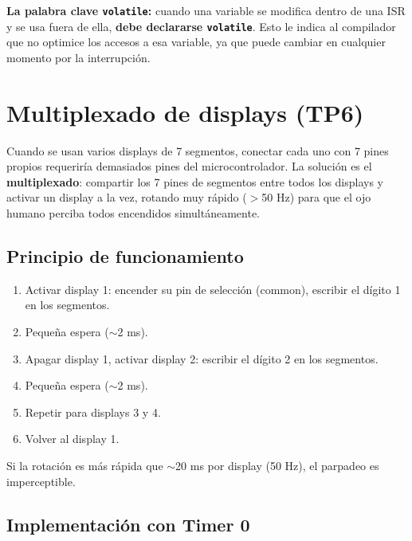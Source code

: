 \begin{notabox}
\textbf{La palabra clave \texttt{volatile}:} cuando una variable se modifica dentro
de una ISR y se usa fuera de ella, \textbf{debe declararse \texttt{volatile}}. Esto
le indica al compilador que no optimice los accesos a esa variable, ya que puede
cambiar en cualquier momento por la interrupción.
\end{notabox}

\section{Multiplexado de displays (TP6)}

Cuando se usan varios displays de 7 segmentos, conectar cada uno con 7 pines propios
requeriría demasiados pines del microcontrolador. La solución es el
\textbf{multiplexado}: compartir los 7 pines de segmentos entre todos los displays y
activar un display a la vez, rotando muy rápido ($>$50 Hz) para que el ojo humano
perciba todos encendidos simultáneamente.


\subsection{Principio de funcionamiento}

\begin{enumerate}
    \item Activar display 1: encender su pin de selección (common), escribir el
          dígito 1 en los segmentos.
    \item Pequeña espera ($\sim$2 ms).
    \item Apagar display 1, activar display 2: escribir el dígito 2 en los segmentos.
    \item Pequeña espera ($\sim$2 ms).
    \item Repetir para displays 3 y 4.
    \item Volver al display 1.
\end{enumerate}

Si la rotación es más rápida que $\sim$20 ms por display (50 Hz), el parpadeo es
imperceptible.

\subsection{Implementación con Timer 0}

